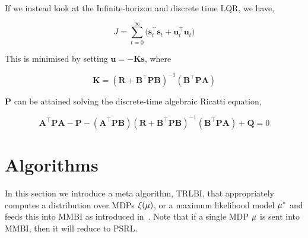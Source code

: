 If we instead look at the Infinite-horizon and discrete time LQR, we have,

\begin{equation}
    J =\sum_{t=0}^\infty \Big(\bm{s}_t^\top \bm{s}_t + \bm{u}_t^\top \bm{u}_t\Big)
\end{equation}

This is minimised by setting $\bm{u} = - \mathbf{K}\bm{s}$, where

\begin{equation}
    \mathbf{K} = (\mathbf{R} + \mathbf{B}^\top \mathbf{P} \mathbf{B})^{-1}(\mathbf{B}^\top\mathbf{P}\mathbf{A})
\end{equation}

$\mathbf{P}$ can be attained solving the discrete-time algebraic Ricatti equation,

\begin{equation}
    \mathbf{A}^\top \mathbf{P}\mathbf{A}-\mathbf{P}-(\mathbf{A}^\top\mathbf{P}\mathbf{B})(\mathbf{R}+\mathbf{B}^\top\mathbf{P}\mathbf{B})^{-1}(\mathbf{B}^\top\mathbf{P}\mathbf{A})+\mathbf{Q}=0
\end{equation}

\section{Algorithms}\label{sec:algorithms}

In this section we introduce a meta algorithm, \textsc{TRLBI}, that appropriately computes a distribution over MDPs $\xi(\mu)$, or a maximum likelihood model $\mu^{*}$ and feeds this into MMBI as introduced in~\cite{dimitrakakis:mmbi:ewrl:2011}. Note that if a single MDP $\mu$ is sent into \textsc{MMBI}, then it will reduce to \textsc{PSRL}\cite{osband2013more}.

